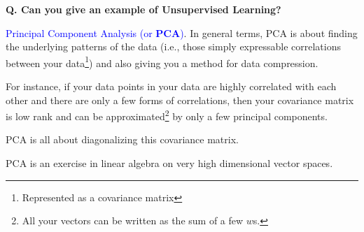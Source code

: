 \begin{frame}[fragile]{\textbf{Q. Can you give an example of Unsupervised Learning?}}
  \begin{wideitemize}
  \item \textcolor{blue}{Principal Component Analysis (or \textbf{PCA})}. In
    general terms, PCA is about finding the underlying patterns of the data
    (i.e., those simply expressable correlations between your
    data\footnote{Represented as a covariance matrix}) and also giving you a
    method for data compression.\medskip
    \begin{wideitemize}
      \item For instance, if your data points in your data are highly correlated
        with each other and there are only a few forms of correlations, then
        your covariance matrix is low rank and can be approximated\footnote{All
          your vectors can be written as the sum of a few $w$s.} by only a few
        principal components.
    \end{wideitemize}
  \item PCA is all about diagonalizing this covariance matrix.
    \begin{wideitemize}
    \item PCA is an exercise in linear algebra on very high dimensional vector spaces.
    \end{wideitemize}
  \end{wideitemize}
\end{frame}




